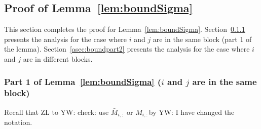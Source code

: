 \iffalse
\subsection{The probability $\{i, j\}$ is an edge}\label{asec:probedge}
Below is the formal result for Eq.~\ref{eqn:probedge}. 

\begin{corollary}\label{cor:tunetau} Let $\epsilon$ be an arbitrary small constant. Let $\calf = (M_{i,:}, \mX, E_{i,:})$ (i.e., the $\sigma$-algebra generated by $M_{i,:}$, $\mX$ and $E$).  For a given $\ell$, there exists a constant $c_0$, a $\tau = \Theta(\sqrt \ell)$, and a negligible $\delta$ such that when $n \geq c_0 \ell$, 

\begin{itemize}
    \item If $i$ and $j$ are in the same block, then
    \begin{equation}
        \Pr_{\calf}\left[\Pr_{M_{j,:}, E_{j,:}}[\hat \Sigma_{i,j} \geq \tau\mid \calf] \geq 1 - \epsilon\right] \geq 1- \delta
    \end{equation}
    \item If $i$ and $j$ are not in the same block, then
\begin{equation}
        \Pr_{\calf}\left[\Pr_{M_{j,:}, E_{j,:}}[\hat \Sigma_{i,j} \geq \tau\mid \calf] \in (1\pm 0.01)   \epsilon\right] \geq 1- \delta
    \end{equation}
\end{itemize}
\end{corollary}
This lemma means for most of $M_{i,:}, \mX, E_{i,:}$, the behavior of $\Pr[\hat \Sigma_{i,j} \geq \tau\mid \calf]$ is ``not surprising'': when $i$ and $j$ are in the same block, $\{i,j\} \in E(G)$ with probability $1-\epsilon$; otherwise, $\{i, j\} \in E(G)$ with probability $\epsilon$.  
\fi

\subsection{Proof of Lemma~\ref{lem:boundSigma}}\label{asec:prooflem41}
This section completes the proof for Lemma~\ref{lem:boundSigma}. Section~\ref{asec:boundpart1} presents the analysis for the case where $i$ and $j$ are in the same block (part 1 of the lemma). Section~\ref{asec:boundpart2} presents the analysis for the case where $i$ and $j$ are in different blocks. 


\subsubsection{Part 1 of Lemma~\ref{lem:boundSigma} ($i$ and $j$ are in the same block)}\label{asec:boundpart1}
Recall that
{\color{blue} ZL to YW: check: use $\bar M_{i, :}$ or $M_{i, :}$}{\color{red}by YW: I have changed the notation.}

